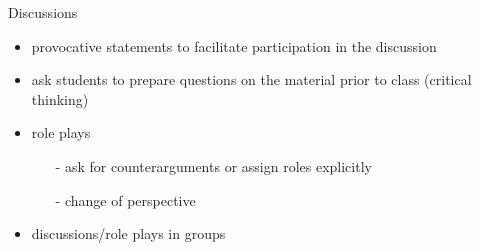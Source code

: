 \begin{frame}{Discussions}
	\pause
	\begin{itemize}[<+->]
		\item provocative statements to \alert{facilitate participation} in the discussion
		\item ask students to prepare questions on the material prior to class	(\alert{critical thinking})	
		\item {role plays}
		\begin{itemize}
			\item[-] ask for counterarguments  or assign roles explicitly
			\item[-] \alert{change of perspective}
		\end{itemize}
	\item discussions/role plays in \alert{groups}
	\end{itemize}
\end{frame}


